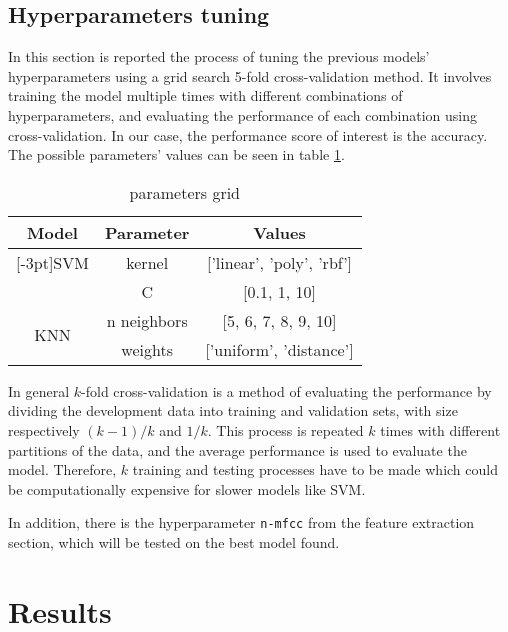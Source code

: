 \documentclass[conference]{IEEEtran}
\begin{document}
\subsection{Hyperparameters tuning}
In this section is reported the process of tuning the previous models' hyperparameters using a grid search 5-fold cross-validation method.
It involves training the model multiple times with different combinations of hyperparameters, and evaluating the performance of each combination using cross-validation.
In our case, the performance score of interest is the accuracy.
The possible parameters' values can be seen in table \ref{tab:grid}.

\begin{table}
    \centering
    \caption{parameters grid}
    \begin{tabular}{ccc}
        \toprule
        \toprule
        Model & Parameter & Values\\
        \midrule
        \addlinespace[5pt]
        \multirow{2}{*}[-3pt]{SVM}  & kernel & ['linear', 'poly', 'rbf']\\
                                    \cmidrule{2-3}
                                    & C      & [0.1, 1, 10]\\
        \midrule
        \multirow{2}{*}[-3pt]{KNN}  & n neighbors & [5, 6, 7, 8, 9, 10]\\
                                    \cmidrule{2-3}
                                    & weights     & ['uniform', 'distance']\\
        \bottomrule
    \end{tabular}
    \label{tab:grid}
\end{table}

In general $k$-fold cross-validation is a method of evaluating the performance by dividing the development data into training and validation sets, with size respectively $(k-1)/k$ and $1/k$.
This process is repeated $k$ times with different partitions of the data, and the average performance is used to evaluate the model.
Therefore, $k$ training and testing processes have to be made which could be computationally expensive for slower models like SVM.

In addition, there is the hyperparameter \texttt{n-mfcc} from the feature extraction section, which will be tested on the best model found.

\section{Results}
\end{document}
